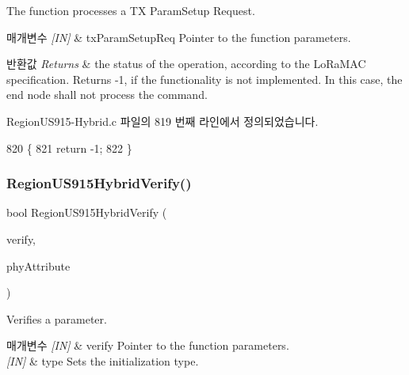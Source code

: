 The function processes a TX Param\+Setup Request. 


\begin{DoxyParams}{매개변수}
{\em \mbox{[}\+I\+N\mbox{]}} & tx\+Param\+Setup\+Req Pointer to the function parameters.\\
\hline
\end{DoxyParams}

\begin{DoxyRetVals}{반환값}
{\em Returns} & the status of the operation, according to the Lo\+Ra\+M\+AC specification. Returns -\/1, if the functionality is not implemented. In this case, the end node shall not process the command. \\
\hline
\end{DoxyRetVals}


Region\+U\+S915-\/\+Hybrid.\+c 파일의 819 번째 라인에서 정의되었습니다.


\begin{DoxyCode}
820 \{
821     \textcolor{keywordflow}{return} -1;
822 \}
\end{DoxyCode}
\mbox{\label{group___r_e_g_i_o_n_u_s915_h_y_b_ga0fb0094a0833782259c6be87d3d4b141}} 
\subsubsection{\texorpdfstring{Region\+U\+S915\+Hybrid\+Verify()}{RegionUS915HybridVerify()}}
{\footnotesize\ttfamily bool Region\+U\+S915\+Hybrid\+Verify (\begin{DoxyParamCaption}\item[{\mbox{\hyperlink{group___r_e_g_i_o_n_ga966d97bc2f25df1c09e92e60ef652276}{Verify\+Params\+\_\+t}} $\ast$}]{verify,  }\item[{\mbox{\hyperlink{group___r_e_g_i_o_n_ga9445b07fdf77581ecfaf389970e635f8}{Phy\+Attribute\+\_\+t}}}]{phy\+Attribute }\end{DoxyParamCaption})}



Verifies a parameter. 


\begin{DoxyParams}{매개변수}
{\em \mbox{[}\+I\+N\mbox{]}} & verify Pointer to the function parameters.\\
\hline
{\em \mbox{[}\+I\+N\mbox{]}} & type Sets the initialization type.\\
\hline
\end{DoxyParams}

